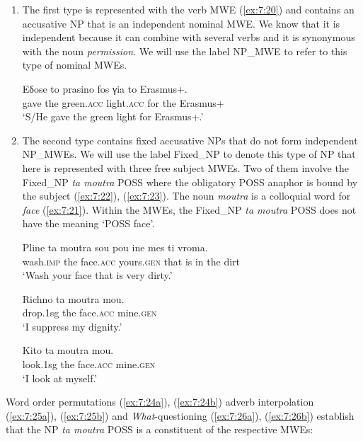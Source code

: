 \documentclass[output=paper]{langsci/langscibook}
\begin{document}
\begin{enumerate}
\item The first type is represented with the verb MWE  (\ref{ex:7:20})  and  contains an accusative NP that is an independent nominal MWE. We know that it is independent because it can combine with several verbs and it is synonymous with the noun \textit{permission}.  We will use the label NP\_MWE to refer to this type of nominal MWEs.

\ea%
    \label{ex:7:20}
\gll Eδose to prasino fos γia to Erasmus+.\\
             gave  the green.\textsc{acc} light.\textsc{acc} for the Erasmus+       \\
\glt        `S/He gave the green light for Erasmus+.'
\z

\item  The second type contains fixed accusative NPs that do not form independent NP\_MWEs. We will use the label Fixed\_NP to denote this type of NP that here is represented with three free subject MWEs. Two of them involve the Fixed\_NP  {\normalfont \itshape ta moutra} POSS where the obligatory \textsc{POSS} anaphor is bound by the subject (\ref{ex:7:22}), (\ref{ex:7:23}).  The noun \textit {\normalfont \itshape moutra} is a colloquial word for \textit{face} (\ref{ex:7:21}). Within the MWEs, the Fixed\_NP \textit {\normalfont \itshape ta moutra} POSS does not have the meaning `POSS face'.  

\ea
\label{ex:7:21}
\gll     Pline ta moutra sou pou ine mes ti vroma.\\
            wash.\textsc{imp} the face.\textsc{acc} yours.\textsc{gen} that is in the dirt\\
\glt        `Wash your face that is very dirty.'
\z

\ea
\label{ex:7:22}
\gll       Richno ta moutra mou.\\
             drop.1sg  the face.\textsc{acc} mine.\textsc{gen}\\
\glt      `I suppress my dignity.'
\z

\ea
\label{ex:7:23}
\gll    Kito ta moutra mou.\\
            look.1sg the face.\textsc{acc} mine.\textsc{gen}\\
\glt       `I look at myself.'
\z
\end{enumerate}

Word order permutations (\ref{ex:7:24a}), (\ref{ex:7:24b}) adverb interpolation (\ref{ex:7:25a}), (\ref{ex:7:25b}) and \textit{What}-questioning (\ref{ex:7:26a}), (\ref{ex:7:26b}) establish that the NP {\normalfont \itshape ta moutra} POSS is a constituent of the respective MWEs:
\end{document}
